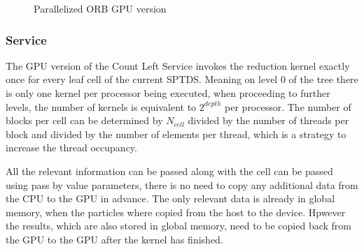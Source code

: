 \documentclass[]{article}
\begin{document}
\begin{figure}[H]
	\begin{center}
	\end{center}
	\caption{Parallelized ORB GPU version}
	\label{fig:orbgpup}
\end{figure}

\subsubsection{Service}

The GPU version of the Count Left Service invokes the reduction kernel exactly once for every leaf cell of the current SPTDS. Meaning on level 0 of the tree there is only one kernel per processor being executed, when proceeding to further levels, the number of kernels is equivalent to $2^{depth}$ per processor. 
The number of blocks per cell can be determined by $N_{cell}$ divided by the number of threads per block and divided by the number of elements per thread, which is a strategy to increase the thread occupancy. 

All the relevant information can be passed along with the cell can be passed using pass by value  parameters, there is no need to copy any additional data from the CPU to the GPU in advance. The only relevant data is already in global memory, when the particles where copied from the host to the device. Hpwever the results, which are also stored in global memory, need to be copied back from the GPU to the GPU after the kernel has finished.
\end{document}
